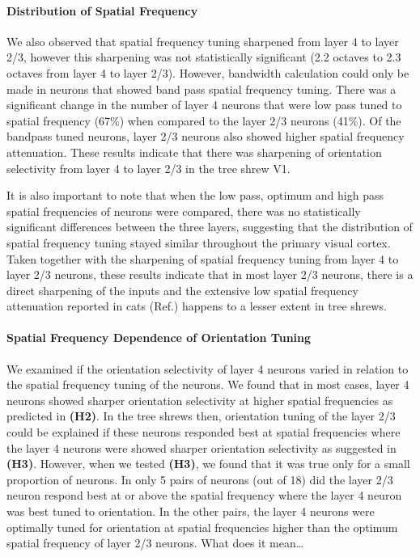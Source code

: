 \paragraph{Distribution of Spatial Frequency}

We also observed that spatial frequency tuning sharpened from layer 4 to
layer 2/3, however this sharpening was not statistically significant
(2.2 octaves to 2.3 octaves from layer 4 to layer 2/3). However,
bandwidth calculation could only be made in neurons that showed band
pass spatial frequency tuning. There was a significant change in the
number of layer 4 neurons that were low pass tuned to spatial frequency
(67\%) when compared to the layer 2/3 neurons (41\%). Of the bandpass
tuned neurons, layer 2/3 neurons also showed higher spatial frequency
attenuation. These results indicate that there was sharpening of
orientation selectivity from layer 4 to layer 2/3 in the tree shrew V1.

It is also important to note that when the low pass, optimum and high
pass spatial frequencies of neurons were compared, there was no
statistically significant differences between the three layers,
suggesting that the distribution of spatial frequency tuning stayed
similar throughout the primary visual cortex. Taken together with the
sharpening of spatial frequency tuning from layer 4 to layer 2/3
neurons, these results indicate that in most layer 2/3 neurons, there is
a direct sharpening of the inputs and the extensive low spatial
frequency attenuation reported in cats (Ref.) happens to a lesser extent
in tree shrews.


\paragraph{Spatial Frequency Dependence of Orientation Tuning}

We examined if the orientation selectivity of layer 4 neurons varied in
relation to the spatial frequency tuning of the neurons. We found that
in most cases, layer 4 neurons showed sharper orientation selectivity at
higher spatial frequencies as predicted in \textbf{(H2)}. In the tree
shrews then, orientation tuning of the layer 2/3 could be explained if
these neurons responded best at spatial frequencies where the layer 4
neurons were showed sharper orientation selectivity as suggested in
\textbf{(H3)}. However, when we tested \textbf{(H3)}, we found that it
was true only for a small proportion of neurons. In only 5 pairs of
neurons (out of 18) did the layer 2/3 neuron respond best at or above
the spatial frequency where the layer 4 neuron was best tuned to
orientation. In the other pairs, the layer 4 neurons were optimally
tuned for orientation at spatial frequencies higher than the optimum
spatial frequency of layer 2/3 neurons. What does it mean\ldots{}


